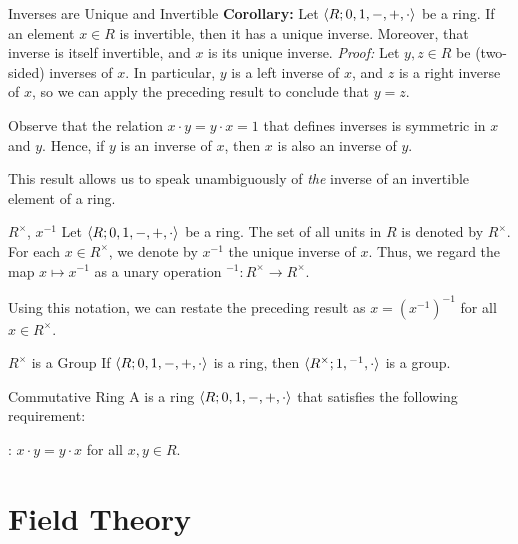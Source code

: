 \documentclass[12pt]{report}
\begin{document}
\begin{thmbox}{Inverses are Unique and Invertible}
	\textbf{Corollary:} Let ${\langle {R; 0, 1, -, +, \cdot} \rangle}$ be a ring. If an element $x \in R$ is invertible, then it has a unique inverse. Moreover, that inverse is itself invertible, and $x$ is its unique inverse.
\tcblower
	\textit{Proof:} Let $y,z \in R$ be (two-sided) inverses of $x$. In particular, $y$ is a left inverse of $x$, and $z$ is a right inverse of $x$, so we can apply the preceding result to conclude that $y = z$.

	Observe that the relation $x \cdot y = y \cdot x = 1$ that defines inverses is symmetric in $x$ and $y$. Hence, if $y$ is an inverse of $x$, then $x$ is also an inverse of $y$.
\end{thmbox}

This result allows us to speak unambiguously of \textit{the} inverse of an invertible element of a ring.

\begin{dfnbox}{$R^\times$, $x^{-1}$}
	Let ${\langle {R; 0, 1, -, +, \cdot} \rangle}$ be a ring. The set of all units in $R$ is denoted by $R^\times$. For each $x \in R^\times$, we denote by $x^{-1}$ the unique inverse of $x$. Thus, we regard the map $x \mapsto x^{-1}$ as a unary operation ${}^{-1}: R^\times \to R^\times$.
\end{dfnbox}

Using this notation, we can restate the preceding result as $x = (x^{-1})^{-1}$ for all $x \in R^\times$.

\begin{thmbox}{$R^\times$ is a Group}
	If ${\langle {R; 0, 1, -, +, \cdot} \rangle}$ is a ring, then ${\langle {R^\times; 1, {}^{-1}, \cdot} \rangle}$ is a group.
\end{thmbox}

\begin{dfnbox}{Commutative Ring}
	A  is a ring ${\langle {R; 0, 1, -, +, \cdot} \rangle}$ that satisfies the following requirement:
	\begin{dfnitems}
		\item {}: $x \cdot y = y \cdot x$ for all $x, y \in R$.
	\end{dfnitems}
\end{dfnbox}



\chapter{Field Theory}
\end{document}
